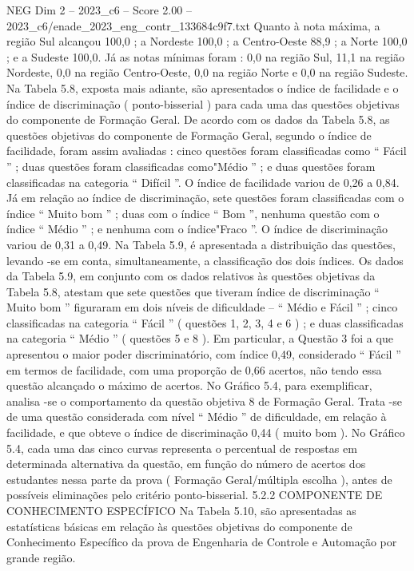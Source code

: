 \begin{textsample}{NEG Dim 2 – 2023\_c6 – Score 2.00 – 2023\_c6/enade\_2023\_eng\_contr\_133684c9f7.txt}
Quanto à nota máxima, a região Sul alcançou 100,0 ; a Nordeste 100,0 ; a Centro-Oeste 88,9 ; a Norte 100,0 ; e a Sudeste 100,0.
Já as notas mínimas foram : 0,0 na região Sul, 11,1 na região Nordeste, 0,0 na região Centro-Oeste, 0,0 na região Norte e 0,0 na região Sudeste.
Na Tabela 5.8, exposta mais adiante, são apresentados o índice de facilidade e o índice de discriminação ( ponto-bisserial ) para cada uma das questões objetivas do componente de Formação Geral.
De acordo com os dados da Tabela 5.8, as questões objetivas do componente de Formação Geral, segundo o índice de facilidade, foram assim avaliadas : cinco questões foram classificadas como “ Fácil ” ; duas questões foram classificadas como"Médio ” ; e duas questões foram classificadas na categoria “ Difícil ”.
O índice de facilidade variou de 0,26 a 0,84.
Já em relação ao índice de discriminação, sete questões foram classificadas com o índice “ Muito bom ” ; duas com o índice “ Bom ”, nenhuma questão com o índice “ Médio ” ; e nenhuma com o índice"Fraco ”.
O índice de discriminação variou de 0,31 a 0,49.
Na Tabela 5.9, é apresentada a distribuição das questões, levando -se em conta, simultaneamente, a classificação dos dois índices.
Os dados da Tabela 5.9, em conjunto com os dados relativos às questões objetivas da Tabela 5.8, atestam que sete questões que tiveram índice de discriminação “ Muito bom ” figuraram em dois níveis de dificuldade – “ Médio e Fácil ” ; cinco classificadas na categoria “ Fácil ” ( questões 1, 2, 3, 4 e 6 ) ; e duas classificadas na categoria “ Médio ” ( questões 5 e 8 ).
Em particular, a Questão 3 foi a que apresentou o maior poder discriminatório, com índice 0,49, considerado “ Fácil ” em termos de facilidade, com uma proporção de 0,66 acertos, não tendo essa questão alcançado o máximo de acertos.
No Gráfico 5.4, para exemplificar, analisa -se o comportamento da questão objetiva 8 de Formação Geral.
Trata -se de uma questão considerada com nível “ Médio ” de dificuldade, em relação à facilidade, e que obteve o índice de discriminação 0,44 ( muito bom ).
No Gráfico 5.4, cada uma das cinco curvas representa o percentual de respostas em determinada alternativa da questão, em função do número de acertos dos estudantes nessa parte da prova ( Formação Geral/múltipla escolha ), antes de possíveis eliminações pelo critério ponto-bisserial. 5.2.2 COMPONENTE DE CONHECIMENTO ESPECÍFICO Na Tabela 5.10, são apresentadas as estatísticas básicas em relação às questões objetivas do componente de Conhecimento Específico da prova de Engenharia de Controle e Automação por grande região.

\end{textsample}
